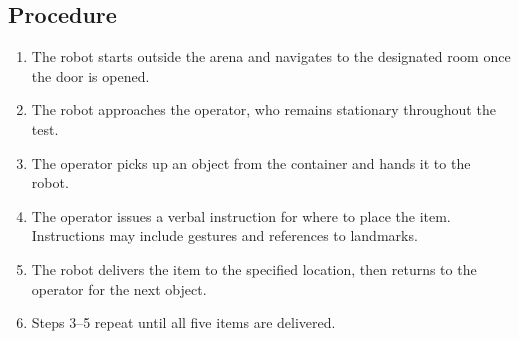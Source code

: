 \subsection*{Procedure}
\begin{enumerate}[nosep]
	\item The robot starts outside the arena and navigates to the designated room once the door is opened.
	\item The robot approaches the operator, who remains stationary throughout the test.
	\item The operator picks up an object from the container and hands it to the robot.
	\item The operator issues a verbal instruction for where to place the item. Instructions may include gestures and references to landmarks.
	\item The robot delivers the item to the specified location, then returns to the operator for the next object.
	\item Steps 3--5 repeat until all five items are delivered.
\end{enumerate}

